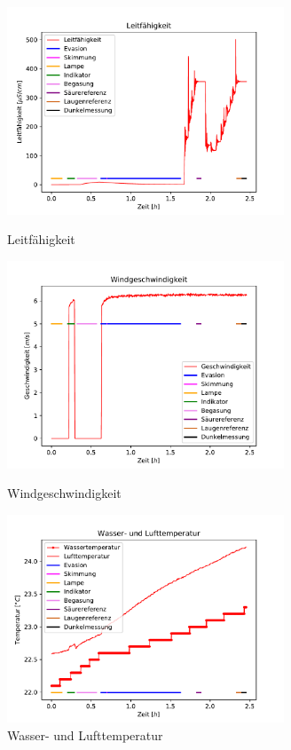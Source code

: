 \documentclass[12pt]{article}
\begin{document}
\begin{figure}[H]
	\centering
	\parbox{82.5mm}{
		\centering
		\includegraphics[width=82.5mm]{VE-Wasser/Leitfaehigkeit}
		\caption{Leitf\"ahigkeit}
	}
	\hfill%
	\parbox{82.5mm}{
		\centering
		\includegraphics[width=82.5mm]{VE-Wasser/Windgeschwindigkeit}
		\caption{Windgeschwindigkeit}
	}
	\centering
	\parbox{82.5mm}{
		\centering
		\includegraphics[width=82.5mm]{VE-Wasser/Wassertemperatur}
		\caption{Wasser- und Lufttemperatur}
	}
	\hfill%
	\parbox{82.5mm}{
		\centering
}
\end{figure}
\end{document}
